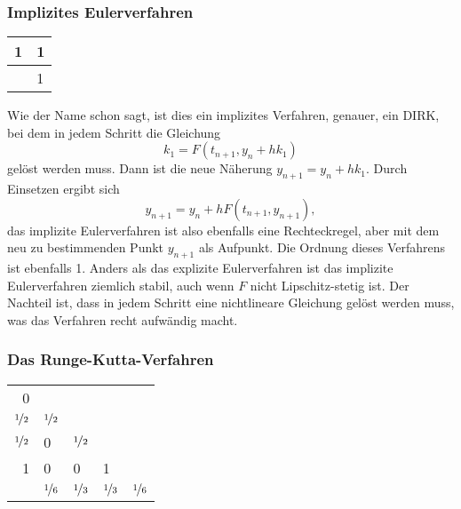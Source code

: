 \subsubsection{Implizites Eulerverfahren}

\begin{center}
  \renewcommand{\arraystretch}{1.3}
  \begin{tabular}{r|l}
    1 & 1\\\hline
    & 1
  \end{tabular}
\end{center}

Wie der Name schon sagt, ist dies ein implizites Verfahren, genauer,
ein DIRK, bei dem in jedem Schritt die Gleichung
\begin{equation}
  k_1 = F(t_{n+1}, y_n + h k_1)
\end{equation}
gelöst werden muss. Dann ist die neue Näherung $y_{n+1} = y_n + h
k_1$. Durch Einsetzen ergibt sich 
\begin{equation}
  y_{n+1} = y_n + h F(t_{n+1}, y_{n+1}),
\end{equation}
das implizite Eulerverfahren ist also ebenfalls eine Rechteckregel,
aber mit dem neu zu bestimmenden Punkt $y_{n+1}$ als Aufpunkt. Die
Ordnung dieses Verfahrens ist ebenfalls 1. Anders als das explizite
Eulerverfahren ist das implizite Eulerverfahren ziemlich stabil, auch
wenn $F$ nicht Lipschitz-stetig ist. Der Nachteil ist, dass in jedem
Schritt eine nichtlineare Gleichung gelöst werden muss, was das
Verfahren recht aufwändig macht.

\subsubsection{Das Runge-Kutta-Verfahren}

\begin{center}
  \renewcommand{\arraystretch}{1.3}
  \begin{tabular}{r|llll}
    0 & \\
    $\nicefrac{1}{2}$ & $\nicefrac{1}{2}$ \\
    $\nicefrac{1}{2}$ & 0 & $\nicefrac{1}{2}$ \\
    1 & 0 & 0 & 1 \\
    \hline
    & $\nicefrac{1}{6}$ &  $\nicefrac{1}{3}$ & 
    $\nicefrac{1}{3}$ &  $\nicefrac{1}{6}$
  \end{tabular}
\end{center}

